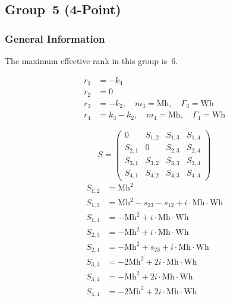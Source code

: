 \documentclass[a4paper]{article}
\begin{document}
\begin{longtable}{cc}
\end{longtable}


\subsection{Group~5 (4-Point)}
\subsubsection*{General Information}
The maximum effective rank in this group is~6.

\begin{subequations}
\begin{align}
r_{1} &= -k_{4}\\
r_{2} &= 0\\
r_{3} &= -k_{2},\quad m_{3} = \text{Mh},\quad \Gamma_{3} = \text{Wh}\\
r_{4} &= k_{3}-k_{2},\quad m_{4} = \text{Mh},\quad \Gamma_{4} = \text{Wh}
\end{align}
\end{subequations}

\begin{equation}
S=\left(\begin{array}{cccc}
   0&
   S_{1,2}&
   S_{1,3}&
   S_{1,4}\\
   S_{2,1}&
   0&
   S_{2,3}&
   S_{2,4}\\
   S_{3,1}&
   S_{3,2}&
   S_{3,3}&
   S_{3,4}\\
   S_{4,1}&
   S_{4,2}&
   S_{4,3}&
   S_{4,4}\end{array}\right)
\end{equation}
\begin{subequations}
\begin{align}
   S_{1,2}&=\text{Mh}^2\\
   S_{1,3}&=\text{Mh}^2-s_{23}-s_{12}+i\cdot{}\text{Mh}\cdot{}\text{Wh}\\
   S_{1,4}&=-\text{Mh}^2+i\cdot{}\text{Mh}\cdot{}\text{Wh}\\
   S_{2,3}&=-\text{Mh}^2+i\cdot{}\text{Mh}\cdot{}\text{Wh}\\
   S_{2,4}&=-\text{Mh}^2+s_{23}+i\cdot{}\text{Mh}\cdot{}\text{Wh}\\
   S_{3,3}&=-2\text{Mh}^2+2i\cdot{}\text{Mh}\cdot{}\text{Wh}\\
   S_{3,4}&=-\text{Mh}^2+2i\cdot{}\text{Mh}\cdot{}\text{Wh}\\
   S_{4,4}&=-2\text{Mh}^2+2i\cdot{}\text{Mh}\cdot{}\text{Wh}
\end{align}
\end{subequations}
\end{document}
